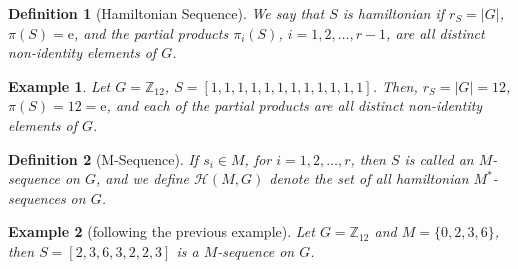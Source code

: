 \documentclass{article}
\newtheorem{definition}{Definition}
\newtheorem{example}{Example}
\begin{document}
\begin{definition}[Hamiltonian Sequence] 
We say that $S$ is \textit{hamiltonian} if $r_S = |G|$, $\pi(S) = \text{e}$, and the partial products $\pi_i(S)$, $i = 1, 2, \dots, r - 1$, are all distinct non-identity elements of $G$. 
\end{definition}
\begin{example}
Let $G=\mathbb{Z}_{12}$, $S = [1, 1, 1, 1, 1, 1, 1, 1, 1, 1, 1, 1]$. Then, $r_S = |G| = 12$, $\pi(S) = 12 = \text{e}$, and each of the partial products are all distinct non-identity elements of $G$.
\end{example}

\begin{definition}[M-Sequence] 
If $s_i \in M$, for $i = 1, 2, \dots, r$, then $S$ is called an $M$-sequence on $G$, and we define $\mathcal{H}(M, G)$ denote the set of all hamiltonian $M^*$-sequences on $G$. 
\end{definition}
\begin{example}[following the previous example]
Let $G=\mathbb{Z}_{12}$ and $M = \{0, 2, 3, 6\}$, then $S = [2, 3, 6, 3, 2, 2, 3]$ is a $M$-sequence on $G$.
\end{example}
\end{document}
